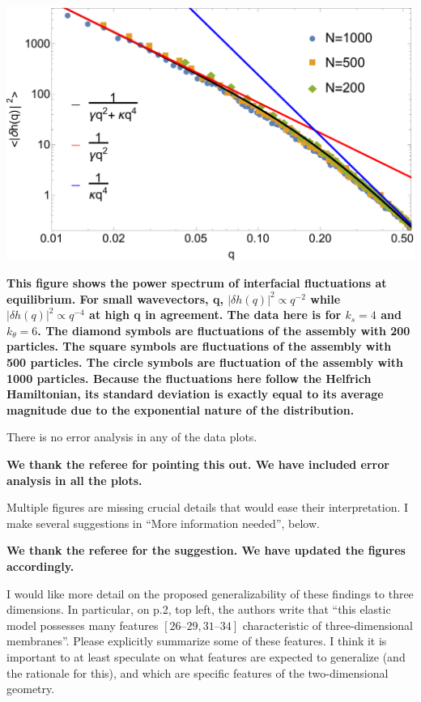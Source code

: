 \documentclass{letter}
\begin{document}
\begin{letter}{}
\begin{minipage}{\textwidth}
\includegraphics[scale=0.35]{scalingindependentofsizeFig2.pdf}
\centering
\end{minipage}
{\bf This figure shows the power spectrum of interfacial fluctuations at equilibrium. For small wavevectors, q, $|\delta h(q)|^2\propto q^{-2}$ while $|\delta h(q)|^2\propto q^{-4}$ at high q in agreement. The data here is for $k_s=4$ and $k_\theta = 6$. The diamond symbols are fluctuations of the assembly with 200 particles. The square symbols are fluctuations of the assembly with 500 particles. The circle symbols are fluctuation of the assembly with 1000 particles. Because the fluctuations here follow the Helfrich Hamiltonian, its standard deviation is exactly equal to its average magnitude due to the exponential nature of the distribution.}


There is no error analysis in any of the data plots. 

{\bf We thank the referee for pointing this out. We have included error analysis in all the plots.}

Multiple figures are missing crucial details that would ease their 
interpretation. I make several suggestions in “More information 
needed”, below. 

{\bf
We thank the referee for the suggestion. We have updated the figures accordingly. }

I would like more detail on the proposed generalizability of these 
findings to three dimensions. In particular, on p.2, top left, the 
authors write that “this elastic model possesses many features $[26–29, 31–34]$ characteristic of three-dimensional membranes”. Please 
explicitly summarize some of these features. I think it is important 
to at least speculate on what features are expected to generalize (and 
the rationale for this), and which are specific features of the 
two-dimensional geometry. 


\end{letter}
\end{document}
